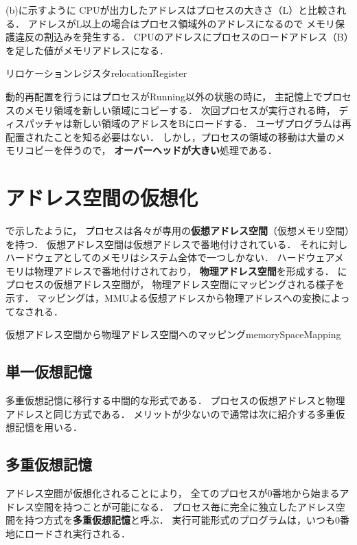 (b)に示すように
CPUが出力したアドレスはプロセスの大きさ（L）と比較される．
アドレスがL以上の場合はプロセス領域外のアドレスになるので
メモリ保護違反の割込みを発生する．
CPUのアドレスにプロセスのロードアドレス（B）を足した値がメモリアドレスになる．

{リロケーションレジスタ}{relocationRegister}

動的再配置を行うにはプロセスがRunning以外の状態の時に，
主記憶上でプロセスのメモリ領域を新しい領域にコピーする．
次回プロセスが実行される時，
ディスパッチャは新しい領域のアドレスをBにロードする．
ユーザプログラムは再配置されたことを知る必要はない．
しかし，プロセスの領域の移動は大量のメモリコピーを伴うので，
{\bf オーバーヘッドが大きい}処理である．

\section{アドレス空間の仮想化}
で示したように，
プロセスは各々が専用の{\bf 仮想アドレス空間}（仮想メモリ空間）を持つ．
仮想アドレス空間は仮想アドレスで番地付けされている．
それに対しハードウェアとしてのメモリはシステム全体で一つしかない．
ハードウェアメモリは物理アドレスで番地付けされており，
{\bf 物理アドレス空間}を形成する．
にプロセスの仮想アドレス空間が，
物理アドレス空間にマッピングされる様子を示す．
マッピングは，MMUよる仮想アドレスから物理アドレスへの変換によってなされる．

{仮想アドレス空間から物理アドレス空間へのマッピング}{memorySpaceMapping}

\subsection{単一仮想記憶}
多重仮想記憶に移行する中間的な形式である．
プロセスの仮想アドレスと物理アドレスと同じ方式である．
メリットが少ないので通常は次に紹介する多重仮想記憶を用いる．

\subsection{多重仮想記憶}
アドレス空間が仮想化されることにより，
全てのプロセスが0番地から始まるアドレス空間を持つことが可能になる．
プロセス毎に完全に独立したアドレス空間を持つ方式を{\bf 多重仮想記憶}と呼ぶ．
実行可能形式のプログラムは，いつも0番地にロードされ実行される．

